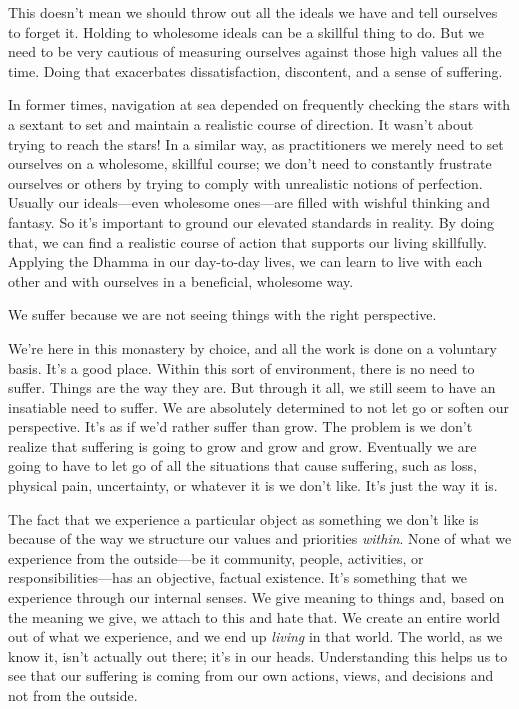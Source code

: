 This doesn't mean we should throw out all the ideals we have and tell
ourselves to forget it. Holding to wholesome \mbox{ideals} can be a
skillful thing to do. But we need to be very cautious of measuring
ourselves against those high values all the time. Doing that exacerbates
dissatisfaction, discontent, and a sense of suffering.

In former times, navigation at sea depended on frequently checking the 
stars with a sextant to set and maintain a realistic course of 
direction. It wasn't about trying to reach the stars! In a similar way, 
as practitioners we merely need to set ourselves on a wholesome, 
skillful course; we don't need to constantly frustrate ourselves or 
others by trying to comply with unrealistic notions of perfection. 
Usually our ideals---even wholesome ones---are filled with wishful 
thinking and fantasy. So it's important to ground our elevated 
standards in reality. By doing that, we can find a realistic course of 
action that supports our living skillfully. Applying the Dhamma in our 
day-to-day lives, we can learn to live with each other and with 
ourselves in a beneficial, wholesome way.


We suffer because we are not seeing things with the right perspective.

We're here in this monastery by choice, and all the work is done on a 
voluntary basis. It's a good place. Within this sort of environment, 
there is no need to suffer. Things are the way they are. But through it 
all, we still seem to have an insatiable need to suffer. We are 
absolutely determined to not let go or soften our perspective. It's as 
if we'd rather suffer than grow. The problem is we don't realize that 
suffering is going to grow and grow and grow. Eventually we are going 
to have to let go of all the situations that cause suffering, such as 
loss, physical pain, uncertainty, or whatever it is we don't like. It's 
just the way it is.

The fact that we experience a particular object as something we don't
like is because of the way we structure our values and priorities
\emph{within}. None of what we experience from the outside---be it
community, people, activities, or responsibilities---has an objective,
factual existence. It's something that we experience through our
internal senses. We give meaning to things and, based on the meaning we
give, we attach to this and hate that. We create an entire world out of
what we experience, and we end up \emph{living} in that world. The
world, as we know it, isn't actually out there; it's in our heads.
\mbox{Understanding} this helps us to see that our suffering is coming
from our own actions, views, and decisions and not from the outside.

